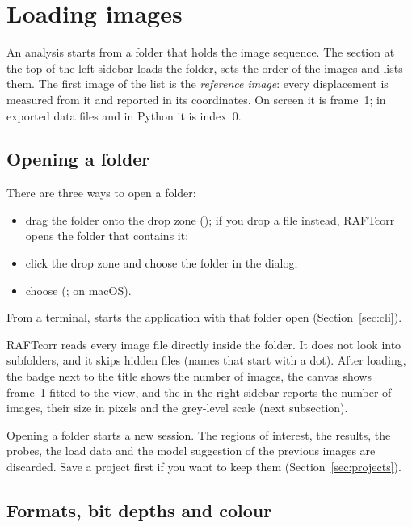 \section{Loading images}
\label{sec:images}

An analysis starts from a folder that holds the image sequence. The  section at the
top of the left sidebar loads the folder, sets the order of the images and lists them. The first
image of the list is the \emph{reference image}: every displacement is measured from it and
reported in its coordinates. On screen it is frame~1; in exported data files and in Python it is
index~0.

\subsection{Opening a folder}

There are three ways to open a folder:
\begin{itemize}
  \item drag the folder onto the drop zone (); if you drop a file
        instead, RAFTcorr opens the folder that contains it;
  \item click the drop zone and choose the folder in the  dialog;
  \item choose  (;  on macOS).
\end{itemize}
From a terminal,  starts the application with that folder open
(Section~\ref{sec:cli}).

RAFTcorr reads every image file directly inside the folder. It does not look into subfolders,
and it skips hidden files (names that start with a dot). After loading, the badge next to the
 title shows the number of images, the canvas shows frame~1 fitted to the view, and
the  in the right sidebar reports the number of images, their size in pixels and the
grey-level scale (next subsection).

\begin{warnbox}
Opening a folder starts a new session. The regions of interest, the results, the probes, the
load data and the model suggestion of the previous images are discarded. Save a project first
if you want to keep them (Section~\ref{sec:projects}).
\end{warnbox}

\subsection{Formats, bit depths and colour}

